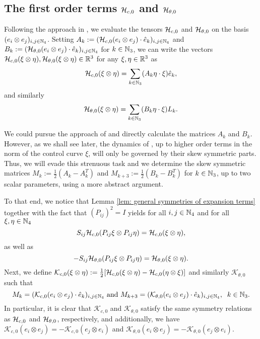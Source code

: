 \subsection{The first order terms $\mathcal{H}_{c,0}$ and $\mathcal{H}_{\theta,0}$}
Following the approach in \cite{Alouges2017}, we evaluate the tensors $\mathcal{H}_{c,0}$ and $\mathcal{H}_{\theta,0}$ on the basis $(e_{i} \otimes e_{j})_{i,j \in \mathbb{N}_4}$. Setting $A_k := (\mathcal{H}_{c,0}(e_i \otimes e_j)\cdot \hat{e}_k)_{i,j \in \mathbb{N}_4}$ and $B_k:= (\mathcal{H}_{\theta,0}(e_i \otimes e_j)\cdot \hat{e}_k)_{i,j \in \mathbb{N}_4}$ for $k \in \mathbb{N}_3$, we can write the vectors $\mathcal{H}_{c,0}(\xi \otimes \eta), \mathcal{H}_{\theta,0}(\xi \otimes \eta) \in \mathbb{R}^3$ for any $\xi, \eta \in \mathbb{R}^3$ as
\begin{equation}
\label{eq: matrix representation of spatial first order term}
	\mathcal{H}_{c,0}(\xi \otimes \eta) = \sum_{k \in \mathbb{N}_3}(A_k \eta \cdot \xi)\hat{e}_k, 
\end{equation}
and similarly
\begin{equation}
\label{eq: matrix representation of angular first order term}
	\mathcal{H}_{\theta, 0}(\xi \otimes \eta) = \sum_{k \in \mathbb{N}_3}(B_k \eta \cdot \xi) L_k.
\end{equation}

We could pursue the approach of \cite{Alouges2017} and directly calculate the matrices $A_k$ and $B_k$. However, as we shall see later, the dynamics of \spr, up to higher order terms in the norm of the control curve $\xi$, will only be governed by their skew symmetric parts. Thus, we will evade this strenuous task and we determine the skew symmetric matrices $M_k := \tfrac{1}{2}(A_k - A_k^T)$ and $M_{k + 3}:= \tfrac{1}{2}(B_k - B_k^T)$ for $k \in \mathbb{N}_3$, up to two scalar parameters, using a more abstract argument.


To that end, we notice that Lemma \ref{lem: general symmetries of expansion terms} together with the fact that $(P_{ij})^2 = I$ yields for all $i,j \in \mathbb{N}_4$ and for all $\xi, \eta \in \mathbb{N}_4$
\begin{equation}
	S_{ij} \mathcal{H}_{c,0}(P_{ij} \xi \otimes P_{ij} \eta) = \mathcal{H}_{c,0}(\xi \otimes \eta),
\end{equation}
as well as
\begin{equation}
	-S_{ij} \mathcal{H}_{\theta,0}(P_{ij} \xi \otimes P_{ij} \eta) = \mathcal{H}_{\theta, 0}(\xi \otimes \eta).
\end{equation}
Next, we define $\mathcal{K}_{c,0}(\xi \otimes \eta) := \tfrac{1}{2}[\mathcal{H}_{c,0}(\xi \otimes \eta) - \mathcal{H}_{c,0}(\eta \otimes \xi)]$ and similarly $\mathcal{K}_{\theta,0}$ such that
\begin{equation}
	M_k = (\mathcal{K}_{c,0}(e_i \otimes e_j) \cdot \hat{e}_k)_{i,j \in \mathbb{N}_4} \text{ and } M_{k + 3} = (\mathcal{K}_{\theta,0}(e_i \otimes e_j) \cdot \hat{e}_k)_{i,j \in \mathbb{N}_4},\;\; k \in \mathbb{N}_3.
\end{equation} 
In particular, it is clear that $\mathcal{K}_{c,0}$ and $\mathcal{K}_{\theta,0}$ satisfy the same symmetry relations as $\mathcal{H}_{c,0}$ and $\mathcal{H}_{\theta, 0}$, respectively, and additionally, we have $\mathcal{K}_{c,0}(e_i \otimes e_j) = - \mathcal{K}_{c,0}(e_j \otimes e_i)$ and $\mathcal{K}_{\theta,0}(e_i \otimes e_j) = - \mathcal{K}_{\theta,0}(e_j \otimes e_i)$.

